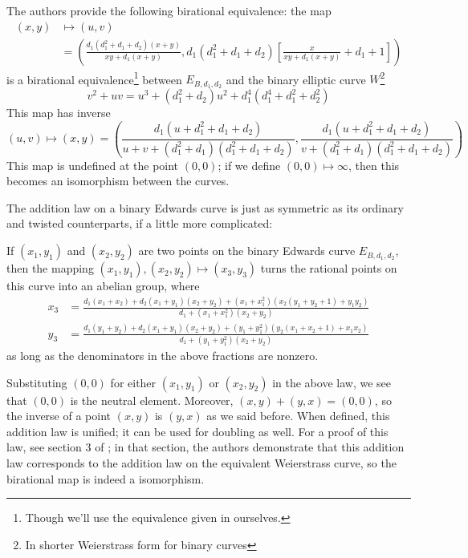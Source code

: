 The authors provide the following birational equivalence: the map
\begin{align*}
(x, y)
    &\mapsto    (u, v)\\
    &=  \left(
            \frac{d_1(d_1^2 + d_1 + d_2)(x + y)}{xy + d_1(x + y)}
            ,
            d_1(d_1^2 + d_1 + d_2)\left[
                \frac{x}{xy + d_1(x + y)} + d_1 + 1
            \right]
        \right)
\end{align*}
    is a birational equivalence\footnote{Though we'll use the equivalence given
    in \cite{moloneyefficient} ourselves.} between $E_{B, d_1, d_2}$ and the
    binary elliptic curve $W$\footnote{In shorter Weierstrass form for binary
    curves}
\[
v^2 + uv = u^3 + (d_1^2 + d_2)u^2 + d_1^4(d_1^4 + d_1^2 + d_2^2)
\]
This map has inverse
\[
(u, v) \mapsto (x, y)
    =   \left(
            \frac{d_1(u + d_1^2 + d_1 + d_2)}
                {u + v + (d_1^2 + d_1)(d_1^2 + d_1 + d_2)}
            ,
            \frac{d_1(u + d_1^2 + d_1 + d_2)}
                {v + (d_1^2 + d_1)(d_1^2 + d_1 + d_2)}
        \right)
\]
This map is undefined at the point $(0, 0)$; if we define $(0, 0) \mapsto
    \infty$, then this becomes an isomorphism between the curves.

The addition law on a binary Edwards curve is just as symmetric as its ordinary
    and twisted counterparts, if a little more complicated:

\begin{thm}
If $(x_1, y_1)$ and $(x_2, y_2)$ are two points on the binary Edwards curve
    $E_{B, d_1, d_2}$, then the mapping $(x_1, y_1), (x_2, y_2) \mapsto (x_3,
    y_3)$ turns the rational points on this curve into an abelian group, where
\begin{align*}
x_3 &=  \frac{d_1(x_1 + x_2) + d_2(x_1 + y_1)(x_2 + y_2) + (x_1 + x_1^2)
            (x_2(y_1 + y_2 + 1) + y_1y_2)}{d_1 + (x_1 + x_1^2)(x_2 + y_2)}\\
y_3 &=  \frac{d_1(y_1 + y_2) + d_2(x_1 + y_1)(x_2 + y_2) + (y_1 + y_1^2)
            (y_2(x_1 + x_2 + 1) + x_1x_2)}{d_1 + (y_1 + y_1^2)(x_2 + y_2)}
\end{align*}
    as long as the denominators in the above fractions are nonzero.
\end{thm}
Substituting $(0, 0)$ for either $(x_1, y_1)$ or $(x_2, y_2)$ in the above law,
    we see that $(0, 0)$ is the neutral element.
Moreover, $(x, y) + (y, x) = (0, 0)$, so the inverse of a point $(x, y)$ is
    $(y, x)$ as we said before.
When defined, this addition law is unified; it can be used for doubling as
    well.
For a proof of this law, see section 3 of \cite{bernstein2008binary}; in that
    section, the authors demonstrate that this addition law corresponds to the
    addition law on the equivalent Weierstrass curve, so the birational map is
    indeed a isomorphism.

